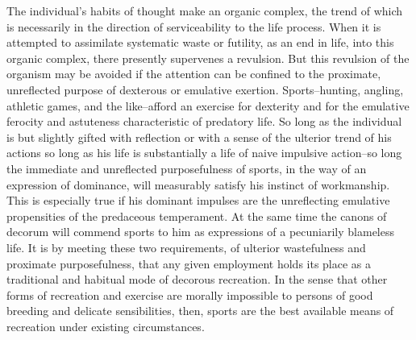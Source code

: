 \documentclass[12pt]{report}
\begin{document}
The individual's habits of thought make an organic complex, the trend
of which is necessarily in the direction of serviceability to the
life process. When it is attempted to assimilate systematic waste or
futility, as an end in life, into this organic complex, there presently
supervenes a revulsion. But this revulsion of the organism may be
avoided if the attention can be confined to the proximate, unreflected
purpose of dexterous or emulative exertion. Sports--hunting, angling,
athletic games, and the like--afford an exercise for dexterity and for
the emulative ferocity and astuteness characteristic of predatory life.
So long as the individual is but slightly gifted with reflection or
with a sense of the ulterior trend of his actions so long as his life
is substantially a life of naive impulsive action--so long the immediate
and unreflected purposefulness of sports, in the way of an expression of
dominance, will measurably satisfy his instinct of workmanship. This is
especially true if his dominant impulses are the unreflecting emulative
propensities of the predaceous temperament. At the same time the canons
of decorum will commend sports to him as expressions of a pecuniarily
blameless life. It is by meeting these two requirements, of ulterior
wastefulness and proximate purposefulness, that any given employment
holds its place as a traditional and habitual mode of decorous
recreation. In the sense that other forms of recreation and exercise
are morally impossible to persons of good breeding and delicate
sensibilities, then, sports are the best available means of recreation
under existing circumstances.
\end{document}
